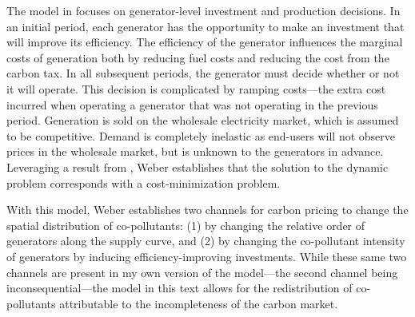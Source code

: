 The model in \cite{weber2021dynamic} focuses on generator-level investment and production decisions. In an initial period, each generator has the opportunity to make an investment that will improve its efficiency. The efficiency of the generator influences the marginal costs of generation both by reducing fuel costs and reducing the cost from the carbon tax. In all subsequent periods, the generator must decide whether or not it will operate. This decision is complicated by ramping costs---the extra cost incurred when operating a generator that was not operating in the previous period. Generation is sold on the wholesale electricity market, which is assumed to be competitive. Demand is completely inelastic as end-users will not observe prices in the wholesale market, but is unknown to the generators in advance. Leveraging a result from \cite{cullen2015}, Weber establishes that the solution to the dynamic problem corresponds with a cost-minimization problem. 

With this model, Weber establishes two channels for carbon pricing to change the spatial distribution of co-pollutants: (1) by changing the relative order of generators along the supply curve, and (2) by changing the co-pollutant intensity of generators by inducing efficiency-improving investments. While these same two channels are present in my own version of the model---the second channel being inconsequential---the model in this text allows for the redistribution of co-pollutants attributable to the incompleteness of the carbon market.




